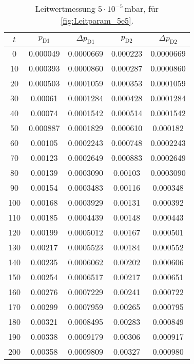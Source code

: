 \begin{table}[H]
    \centering
    \caption{Leitwertmessung $5 \cdot 10^{-5} \, \si{\milli\bar}$, für  \autoref{fig:Leitparam_5e5}.}
    \label{tab:Leitparam_5e5}
    \begin{tabular}{c c c c c}
        \toprule
        {$t$} & {$p_\text{D1}$} & {$\Delta p_\text{D1}$} & {$p_\text{D2}$} & {$\Delta p_\text{D2}$} \\
        \midrule
        0  &  0.000049 & 0.0000669 & 0.000223 & 0.0000669\\
        10 &  0.000393 & 0.0000860 & 0.000287 & 0.0000860\\
        20 &  0.000503 & 0.0001059 & 0.000353 & 0.0001059\\
        30 &  0.00061  & 0.0001284 & 0.000428 & 0.0001284\\
        40 &  0.00074  & 0.0001542 & 0.000514 & 0.0001542\\
        50 &  0.000887 & 0.0001829 & 0.000610 & 0.000182\\
        60 &  0.00105  & 0.0002243 & 0.000748 & 0.0002243\\
        70 &  0.00123  & 0.0002649 & 0.000883 & 0.0002649\\
        80 &  0.00139  & 0.0003090 & 0.00103 & 0.0003090\\
        90 &  0.00154  & 0.0003483 & 0.00116 & 0.000348\\
        100 & 0.00168  & 0.0003929 & 0.00131 & 0.000392\\
        110 & 0.00185  & 0.0004439 & 0.00148 & 0.000443\\
        120 & 0.00199  & 0.0005012 & 0.00167 & 0.000501\\
        130 & 0.00217  & 0.0005523 & 0.00184 & 0.000552\\
        140 & 0.00235  & 0.0006062 & 0.00202 & 0.000606\\
        150 & 0.00254  & 0.0006517 & 0.00217 & 0.000651\\
        160 & 0.00276  & 0.0007229 & 0.00241 & 0.000722\\
        170 & 0.00299  & 0.0007959 & 0.00265 & 0.000795\\
        180 & 0.00321  & 0.0008495 & 0.00283 & 0.000849\\
        190 & 0.00338  & 0.0009179 & 0.00306 & 0.000917\\
        200 & 0.00358  & 0.0009809 & 0.00327 & 0.000980\\
        \bottomrule
    \end{tabular}
\end{table}